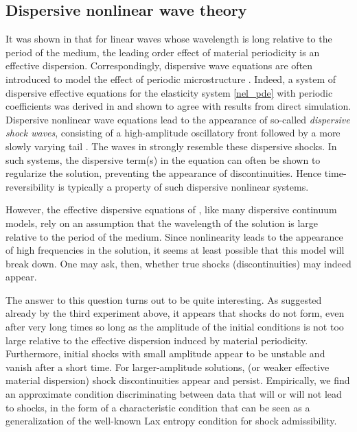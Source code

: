 \subsection{Dispersive nonlinear wave theory}
It was shown in \cite{santosa1991} that for linear waves whose wavelength is
long relative to the period of the medium, the leading order
effect of material periodicity is an effective dispersion.
Correspondingly, dispersive wave equations are often introduced to model
the effect of periodic microstructure \cite{Rubin2009}.
Indeed, a system of dispersive effective equations for the elasticity system
\eqref{nel_pde} with periodic coefficients was derived in \cite{leveque2003} 
and shown to agree with results from direct simulation.
Dispersive nonlinear wave equations lead to the appearance of so-called
{\em dispersive shock waves}, consisting of a high-amplitude oscillatory
front followed by a more slowly varying tail \cite{El2005}.
The waves in  strongly resemble these dispersive shocks.
In such systems, the dispersive term(s) in the equation
can often be shown to regularize the solution, preventing the appearance of 
discontinuities.  Hence time-reversibility is typically a property of such
dispersive nonlinear systems.

However, the effective dispersive equations of \cite{leveque2003}, like
many dispersive continuum models, rely on an assumption that the wavelength of
the solution is large relative to the period of the medium.  Since nonlinearity
leads to the appearance of high frequencies in the solution, it seems at
least possible that this model will break down.  One may ask, then,
whether true shocks (discontinuities) may indeed appear.

The answer to this question turns out to be quite interesting.  As suggested
already by the third experiment above,
it appears that shocks do not form, even after very long times
so long as the amplitude of the initial conditions is not too large 
relative to the effective dispersion induced by material periodicity.
Furthermore, initial shocks with small amplitude appear to be unstable
and vanish after a short time.
For larger-amplitude solutions, (or weaker effective material dispersion) 
shock discontinuities appear and persist.
Empirically, we find an approximate condition discriminating between data 
that will or will not lead to shocks, in the form of a characteristic condition 
that can be seen as a 
generalization of the well-known Lax entropy condition for shock admissibility.

